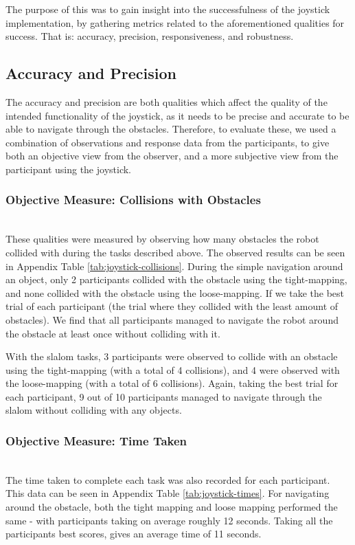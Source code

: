\documentclass{l4proj}
\begin{document}
The purpose of this was to gain insight into the successfulness of the joystick implementation, by gathering metrics related to the aforementioned qualities for success. That is: accuracy, precision, responsiveness, and robustness.

\subsection{Accuracy and Precision}
The accuracy and precision are both qualities which affect the quality of the intended functionality of the joystick, as it needs to be precise and accurate to be able to navigate through the obstacles. Therefore, to evaluate these, we used a combination of observations and response data from the participants, to give both an objective view from the observer, and a more subjective view from the participant using the joystick.

\subsubsection{Objective Measure: Collisions with Obstacles} \hfill \\
These qualities were measured by observing how many obstacles the robot collided with during the tasks described above. The observed results can be seen in Appendix Table \ref{tab:joystick-collisions}. During the simple navigation around an object, only 2 participants collided with the obstacle using the tight-mapping, and none collided with the obstacle using the loose-mapping. If we take the best trial of each participant (the trial where they collided with the least amount of obstacles). We find that all participants managed to navigate the robot around the obstacle at least once without colliding with it.

With the slalom tasks, 3 participants were observed to collide with an obstacle using the tight-mapping (with a total of 4 collisions), and 4 were observed with the loose-mapping (with a total of 6 collisions). Again, taking the best trial for each participant, 9 out of 10 participants managed to navigate through the slalom without colliding with any objects.

\subsubsection{Objective Measure: Time Taken} \hfill \\
The time taken to complete each task was also recorded for each participant. This data can be seen in Appendix Table \ref{tab:joystick-times}. For navigating around the obstacle, both the tight mapping and loose mapping performed the same - with participants taking on average roughly 12 seconds. Taking all the participants best scores, gives an average time of 11 seconds.
\end{document}
